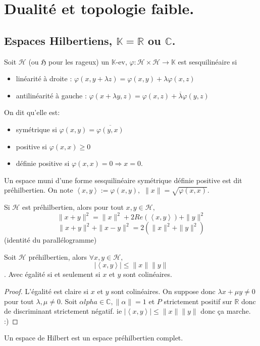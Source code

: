 \section{Dualité et topologie faible.}
\subsection{Espaces Hilbertiens, \texorpdfstring{$\mathbb{K}=\mathbb{R} $ ou $\mathbb{C}$.}{Lg} }
\begin{definition}
    Soit $\mathcal{H}$ (ou $\mathfrak{H}$ pour les rageux) un $\mathbb{K}$-ev, $\varphi :\mathcal{H}\times \mathcal{H}\to \mathbb{K}$ est sesquilinéaire si
    \begin{itemize}
        \item linéarité à droite : $\varphi (x,y+\lambda z)=\varphi (x,y)+\lambda \varphi (x,z)$
    \item antilinéarité à gauche : $\varphi (x+\lambda y,z)=\varphi (x,z)+\overline{\lambda}\varphi (y,z)$
    \end{itemize}

    On dit qu'elle est:
    \begin{itemize}
        \item symétrique si $\varphi (x,y)=\overline{\varphi (y,x)}$
        \item positive si $\varphi (x,x)\ge 0$
        \item définie positive si $\varphi (x,x)=0\Rightarrow x=0$.
    \end{itemize}
\end{definition}
Un espace muni d'une forme sesquilinéaire symétrique définie positive est dit préhilbertien. On note $\left<x,y \right> := \varphi (x,y),$ $\|x\|=\sqrt{\varphi (x,x)} $.
\begin{remarque}
    Si $\mathcal{H}$ est préhilbertien, alors pour tout $x,y\in \mathcal{H},$ $$\|x+y\|^2=\|x\|^2+2Re\left( \left<x,y \right> \right) +\|y\|^2$$
    $$\|x+y\|^2+\|x-y\|^2=2\left( \|x\|^2+\|y\|^2 \right) $$
    (identité du parallélogramme)
\end{remarque}
\begin{propriete}
    Soit $\mathcal{H}$ préhilbertien, alors $\forall x,y\in \mathcal{H},$\\
    $$|\left<x,y \right>| \le \|x\|\|y\| $$.
    Avec égalité si et seulement si $x$ et $y$ sont colinéaires.
\end{propriete}
\begin{proof}
    L'égalité est claire si $x$ et $y$ sont colinéaires. On suppose donc $\lambda x+\mu y\neq 0$ pour tout $\lambda,\mu\neq 0$. Soit $\alpha lpha\in \mathbb{C},\|\alpha \|=1$ et $P$ strictement positif sur $\mathbb{R} $ donc de discriminant strictement négatif. ie $|\left<x,y \right>| \le \|x\|\|y\|$ donc ça marche. :)
\end{proof}
Un espace de Hilbert est un espace préhilbertien complet.

